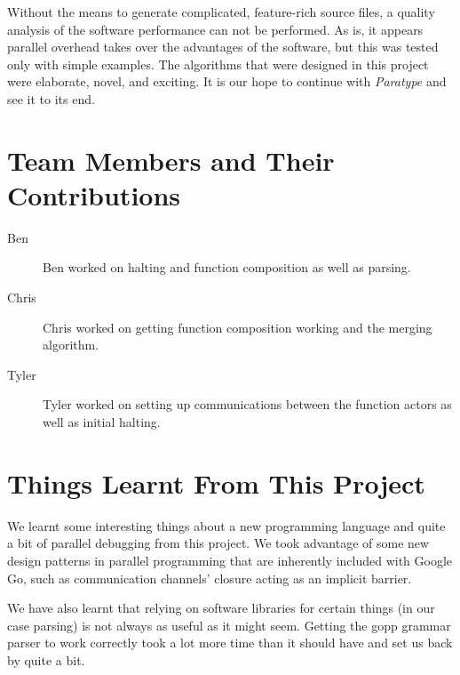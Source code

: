 \documentclass{acm_proc_article-sp}
\begin{document}
Without the means to generate complicated, feature-rich source files, a quality
analysis of the software performance can not be performed. As is, it appears
parallel overhead takes over the advantages of the software, but this was
tested only with simple examples. The algorithms that were designed in this
project were elaborate, novel, and exciting. It is our hope to continue with
\emph{Paratype} and see it to its end.

\appendix

\section{Team Members and Their Contributions}
	\begin{description}
		\item[Ben] Ben worked on halting and function composition as well as
			parsing.
		\item[Chris] Chris worked on getting function composition working and
			the merging algorithm. 
		\item[Tyler] Tyler worked on setting up communications between the
			function actors as well as initial halting.
	\end{description}

\section{Things Learnt From This Project}

	We learnt some interesting things about a new programming language and
	quite a bit of parallel debugging from this project. We took advantage of
	some new design patterns in parallel programming that are inherently
	included with Google Go, such as communication channels' closure acting as
	an implicit barrier.

	We have also learnt that relying on software libraries for certain things
	(in our case parsing) is not always as useful as it might seem. Getting the
	gopp grammar parser to work correctly took a lot more time than it should
	have and set us back by quite a bit.
\end{document}
